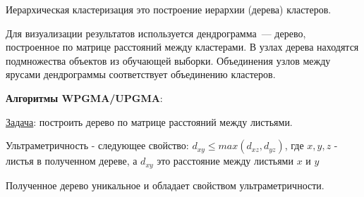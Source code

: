 
\begin{definition}
  Иерархическая кластеризация это построение иерархии (дерева) кластеров.
\end{definition}

Для визуализации результатов используется дендрограмма~--- дерево, построенное
по матрице расстояний между кластерами. В узлах дерева находятся подмножества
объектов из обучающей выборки. Объединения узлов между ярусами дендрограммы
соответствует объединению кластеров.

\textbf{Алгоритмы WPGMA/UPGMA}:

\underline{Задача}: построить дерево по матрице расстояний между листьями.

\begin{definition}
  Ультраметричность - следующее свойство:
  $d_{xy} \leq max(d_{xz}, d_{yz})$, где $x, y, z$ - листья в полученном дереве, а $d_{xy}$ это расстояние между листьями $x$ и $y$
\end{definition}

\begin{remark}
  Полученное дерево уникальное и обладает свойством ультраметричности.
\end{remark}

